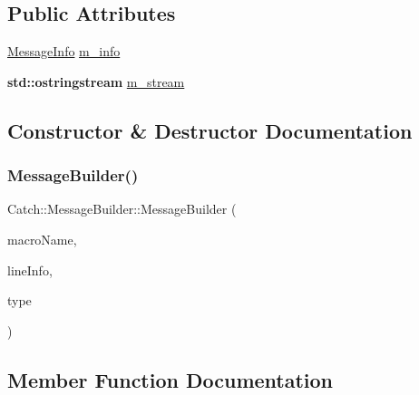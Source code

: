 \subsection*{Public Attributes}
\begin{DoxyCompactItemize}
\item 
\hyperlink{struct_catch_1_1_message_info}{Message\+Info} \hyperlink{struct_catch_1_1_message_builder_a979f1c2b36d78f80ee275bfa5ba0209f}{m\+\_\+info}
\item 
\textbf{ std\+::ostringstream} \hyperlink{struct_catch_1_1_message_builder_a6488ab0cc4ea52affc9c0612c7c5df6b}{m\+\_\+stream}
\end{DoxyCompactItemize}


\subsection{Constructor \& Destructor Documentation}
\mbox{\label{struct_catch_1_1_message_builder_ab0c6378e722680bf58852c6ee2b6e724}} 
\subsubsection{\texorpdfstring{Message\+Builder()}{MessageBuilder()}}
{\footnotesize\ttfamily Catch\+::\+Message\+Builder\+::\+Message\+Builder (\begin{DoxyParamCaption}\item[{\textbf{ std\+::string} const \&}]{macro\+Name,  }\item[{\hyperlink{struct_catch_1_1_source_line_info}{Source\+Line\+Info} const \&}]{line\+Info,  }\item[{\hyperlink{struct_catch_1_1_result_was_a624e1ee3661fcf6094ceef1f654601ef}{Result\+Was\+::\+Of\+Type}}]{type }\end{DoxyParamCaption})\hspace{0.3cm}{\ttfamily [inline]}}



\subsection{Member Function Documentation}
\mbox{\label{struct_catch_1_1_message_builder_a20fa48d069b20dddcc2d3df8abb123c1}} 
